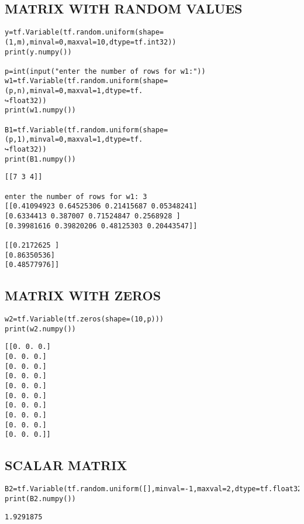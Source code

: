 \subsection{MATRIX WITH RANDOM VALUES}
\vspace{-.75cm}
\begin{code}
\begin{lstlisting}
y=tf.Variable(tf.random.uniform(shape=(1,m),minval=0,maxval=10,dtype=tf.int32))
print(y.numpy())

p=int(input("enter the number of rows for w1:"))
w1=tf.Variable(tf.random.uniform(shape=(p,n),minval=0,maxval=1,dtype=tf.
↪float32))
print(w1.numpy())

B1=tf.Variable(tf.random.uniform(shape=(p,1),minval=0,maxval=1,dtype=tf.
↪float32))
print(B1.numpy())
\end{lstlisting}
\end{code}
\vspace{-1cm}
\begin{verbatim}
[[7 3 4]]

enter the number of rows for w1: 3
[[0.41094923 0.64525306 0.21415687 0.05348241]
[0.6334413 0.387007 0.71524847 0.2568928 ]
[0.39981616 0.39820206 0.48125303 0.20443547]]

[[0.2172625 ]
[0.86350536]
[0.48577976]]

\end{verbatim}
\vspace{-.75cm}
\subsection{MATRIX WITH ZEROS}
\vspace{-.6cm}
\begin{code}
\begin{lstlisting}
w2=tf.Variable(tf.zeros(shape=(10,p)))
print(w2.numpy())

\end{lstlisting}
\end{code}
\vspace{-.75cm}
\begin{verbatim}
[[0. 0. 0.]
[0. 0. 0.]
[0. 0. 0.]
[0. 0. 0.]
[0. 0. 0.]
[0. 0. 0.]
[0. 0. 0.]
[0. 0. 0.]
[0. 0. 0.]
[0. 0. 0.]]

\end{verbatim}
\vspace{2cm}
\subsection{SCALAR MATRIX}
\vspace{-.6cm}
\begin{code}
\begin{lstlisting}
B2=tf.Variable(tf.random.uniform([],minval=-1,maxval=2,dtype=tf.float32))
print(B2.numpy())
\end{lstlisting}
\end{code}
\vspace{-1cm}
\begin{verbatim}
1.9291875
\end{verbatim}
